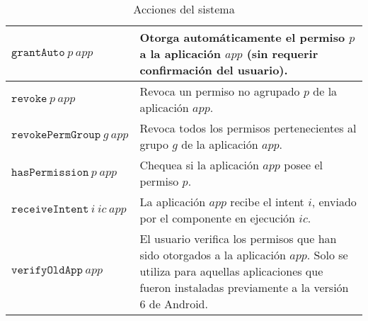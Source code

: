 \begin{table}
\begin{tabularx}{\linewidth}{|l X|}
        \hline
        $\mathtt{grantAuto}~p~app$         & Otorga automáticamente el permiso $p$ a la aplicación $app$ (sin requerir confirmación del usuario).                                                                                                                 \\
        \hline
        $\mathtt{revoke}~p~app$            & Revoca un permiso no agrupado $p$ de la aplicación $app$.                                                                                                                                                            \\
        \hline
        $\mathtt{revokePermGroup}~g~app$   & Revoca todos los permisos pertenecientes al grupo $g$ de la aplicación $app$.                                                                                                                                        \\
        \hline
        $\mathtt{hasPermission}~p~app$     & Chequea si la aplicación $app$ posee el permiso $p$.                                                                                                                                                                 \\
        \hline
        $\mathtt{receiveIntent}~i~ic~app$  & La aplicación $app$ recibe el intent $i$, enviado por el componente en ejecución $ic$.                                                                                                                               \\
        \hline
        $\mathtt{verifyOldApp}~app$        & El usuario verifica los permisos que han sido otorgados a la aplicación $app$. Solo se utiliza para aquellas aplicaciones que fueron instaladas previamente a la versión 6 de Android.                               \\
        \hline
    \end{tabularx}
    \caption{Acciones del sistema}
\end{table}